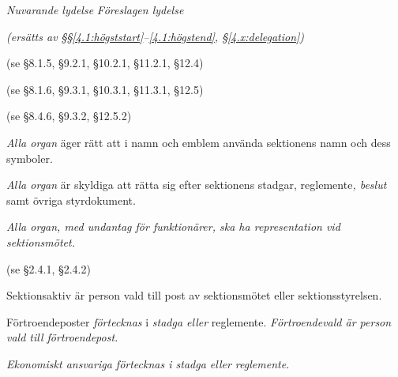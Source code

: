 \documentclass{article}
\newenvironment{lydelse}
    {\begin{paracol}{2}%
        \emph{Nuvarande lydelse}%
        \switchcolumn%
        \emph{Föreslagen lydelse}%
    \end{paracol}%
    \begin{enumerate}[label=\thesubsection.\arabic*]%
    \begin{paracol}{2}%
    }{\end{paracol}\end{enumerate}}
\begin{document}
\begin{lydelse}
	\switchcolumn
	  \emph{(ersätts av \S\S \ref{4.1:högststart}--\ref{4.1:högstend}, \S\ref{4.x:delegation})}
    
	\switchcolumn*
    \item[] (se \S 8.1.5, \S 9.2.1, \S 10.2.1, \S 11.2.1, \S 12.4)

    \item[] (se \S 8.1.6, \S 9.3.1, \S 10.3.1, \S 11.3.1, \S 12.5)

    \item[] (se \S 8.4.6, \S 9.3.2, \S 12.5.2)

  \switchcolumn
    \item \emph{Alla organ} äger rätt att i namn och emblem använda sektionens namn och dess symboler.
      \label{4.1:emblem}

    \item \emph{Alla organ} är skyldiga att rätta sig efter sektionens stadgar, reglemente\emph{, beslut} samt övriga styrdokument.
      \label{4.1:rätta}
      
    \item \emph{Alla organ, med undantag för funktionärer, ska ha representation vid sektionsmötet.} \label{4.1:rep}

  \switchcolumn*
      (se \S 2.4.1, \S 2.4.2)
      
  \switchcolumn
    \item Sektionsaktiv är person vald till post av sektionsmötet eller sektionsstyrelsen.
      \label{4.x:aktiv}
      
    \item Förtroendeposter \emph{förtecknas} i \emph{stadga eller} reglemente.
      \emph{Förtroendevald är person vald till förtroendepost.}
      \label{4.x:fortroende}

    \item \emph{Ekonomiskt ansvariga förtecknas i stadga eller reglemente.}

\end{lydelse}
\end{document}
